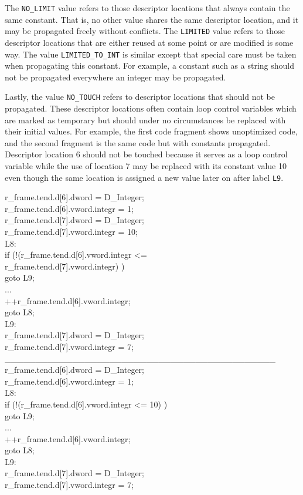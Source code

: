 The \texttt{NO\_LIMIT} value refers to those descriptor locations that
always contain the same constant. That is, no other value shares the
same descriptor location, and it may be propagated freely without
conflicts. The \texttt{LIMITED} value refers to those descriptor
locations that are either reused at some point or are modified is some
way. The value \texttt{LIMITED\_TO\_INT} is similar except that
special care must be taken when propagating this constant. For
example, a constant such as a string should not be propagated
everywhere an integer may be propagated.

Lastly, the value \texttt{NO\_TOUCH} refers to descriptor locations
that should not be propagated. These descriptor locations often
contain loop control variables which are marked as temporary but
should under no circumstances be replaced with their initial
values. For example, the first code fragment shows unoptimized code,
and the second fragment is the same code but with constants
propagated. Descriptor location 6 should not be touched because it
serves as a loop control variable while the use of location 7 may be
replaced with its constant value 10 even though the same location is
assigned a new value later on after label \texttt{L9}.

\begin{iconcode}
\>   r\_frame.tend.d[6].dword = D\_Integer; \\
\>   r\_frame.tend.d[6].vword.integr = 1; \\
\>   r\_frame.tend.d[7].dword = D\_Integer; \\
\>   r\_frame.tend.d[7].vword.integr = 10; \\
L8: \\
\>   if (!(r\_frame.tend.d[6].vword.integr {\textless}= \\
\> \> \> \> \> r\_frame.tend.d[7].vword.integr) ) \\
\>  goto L9; \\
\>   ... \\
\>   ++r\_frame.tend.d[6].vword.integr; \\
\>   goto L8; \\
L9: \\
\>   r\_frame.tend.d[7].dword = D\_Integer; \\
\>   r\_frame.tend.d[7].vword.integr = 7; \\
\_\_\_\_\_\_\_\_\_\_\_\_\_\_\_\_\_\_\_\_\_\_\_\_\_\_\_\_\_\_\_\_\_\_\_\_\_\_\_\_\_\_\_\_ \\
\>   r\_frame.tend.d[6].dword = D\_Integer; \\
\>   r\_frame.tend.d[6].vword.integr = 1; \\
L8: \\
\>   if (!(r\_frame.tend.d[6].vword.integr {\textless}= 10) ) \\
\> \>    goto L9; \\
\>   ... \\
\>   ++r\_frame.tend.d[6].vword.integr; \\
\>   goto L8; \\
L9: \\
\>   r\_frame.tend.d[7].dword = D\_Integer; \\
\>   r\_frame.tend.d[7].vword.integr = 7;
\end{iconcode}



